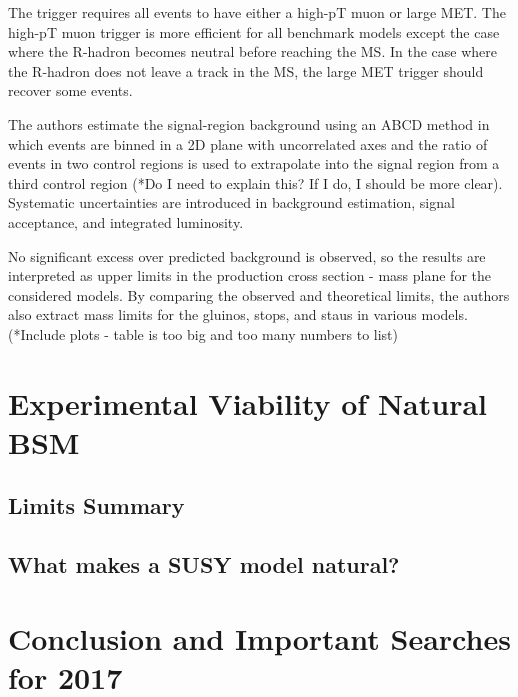 \documentclass[12pt]{article}
\begin{document}
    The trigger requires all events to have either a high-pT muon or large MET. The high-pT muon trigger is more efficient for all benchmark models except the case where the R-hadron becomes neutral before reaching the MS. In the case where the R-hadron does not leave a track in the MS, the large MET trigger should recover some events.  

    The authors estimate the signal-region background using an ABCD method in which events are binned in a 2D plane with uncorrelated axes and the ratio of events in two control regions is used to extrapolate into the signal region from a third control region (*Do I need to explain this? If I do, I should be more clear). Systematic uncertainties are introduced in background estimation, signal acceptance, and integrated luminosity.

    No significant excess over predicted background is observed, so the results are interpreted as upper limits in the production cross section - mass plane for the considered models. By comparing the observed and theoretical limits, the authors also extract mass limits for the gluinos, stops, and staus in various models. (*Include plots - table is too big and too many numbers to list)

\section{Experimental Viability of Natural BSM}
\subsection{Limits Summary}
\subsection{What makes a SUSY model natural?}

\section{Conclusion and Important Searches for 2017}

\clearpage
\pagebreak
\singlespacing
{}

\end{document}
